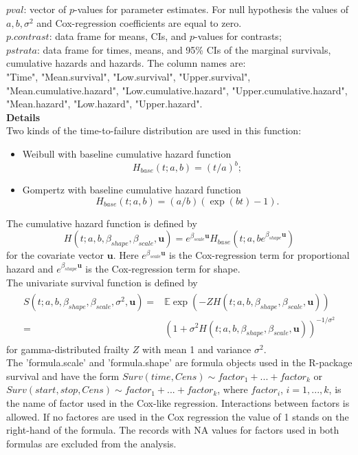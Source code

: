 \documentclass[A4document,12pt]{article}\usepackage[]{graphicx}\usepackage[]{color}
\begin{document}
\noindent
$pval$:        vector of $p$-values for parameter estimates. For null hypothesis the values of $a,b,\sigma^2$ and Cox-regression coefficients are equal to zero.\\
\noindent
$p.contrast$:        data frame for means, CIs, and $p$-values for contrasts;\\
\noindent
$pstrata$:        data frame for times, means, and 95\% CIs of the marginal survivals, cumulative hazards and hazards. The column names are: \\
"Time", "Mean.survival", "Low.survival", "Upper.survival", "Mean.cumulative.hazard", "Low.cumulative.hazard", "Upper.cumulative.hazard", "Mean.hazard", "Low.hazard", "Upper.hazard".   \\
\noindent
\textbf{Details}\\
\noindent
Two kinds of the time-to-failure distribution are used in this function:
\begin{itemize}
\item Weibull with baseline cumulative hazard function
\[H_{base}(t;a,b)=(t/a)^b;\]
\item Gompertz with baseline cumulative hazard function
\[H_{base}(t;a,b)=(a/b)(\exp(bt)-1).\]
\end{itemize}
\noindent
The cumulative hazard function is defined by
\[H(t;a,b,\beta _{shape},\beta _{scale},\mathbf u)=e^{\beta _{scale}\mathbf u}H_{base}(t;a,be^{\beta _{shape}\mathbf u})\]
\noindent
for the covariate vector $\mathbf u$. Here $e^{\beta _{scale}\mathbf u}$ is the Cox-regression term for proportional hazard and $e^{\beta _{shape}\mathbf u}$ is the Cox-regression term for shape.\\
The univariate survival function is defined by
\begin{eqnarray}
\begin{aligned}
S(t;a,b,\beta _{shape},\beta _{scale},\sigma ^2,\mathbf u)=&\mathbb{E}\exp (-ZH(t;a,b,\beta _{shape},\beta _{scale},\mathbf u))\nonumber \\
=&(1+\sigma ^2H(t;a,b,\beta _{shape},\beta _{scale},\mathbf u))^{-1/\sigma ^2}\nonumber 
\end{aligned}
\end{eqnarray}
for gamma-distributed frailty $Z$ with mean 1 and variance $\sigma ^2$.\\
The 'formula.scale' and 'formula.shape' are formula objects used in the R-package survival and have the form $Surv(time,Cens) \sim factor_1+...+factor_k$ or\\$Surv(start,stop,Cens) \sim factor_1+...+factor_k$, where $factor_i$, $i=1,...,k$, is the name of factor used in the Cox-like regression. Interactions between factors is allowed. If no factores are used in the Cox regression the value of 1 stands on the right-hand of the formula. The records with NA values for factors used in both formulas are excluded from the analysis.\\\\
\end{document}
